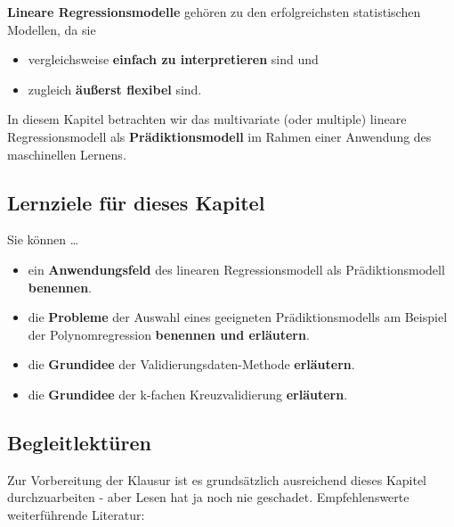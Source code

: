 \documentclass[
  ngerman,
]{book}
\providecommand{\tightlist}{%
  \setlength{\itemsep}{0pt}\setlength{\parskip}{0pt}}
\begin{document}
\textbf{Lineare Regressionsmodelle} gehören zu den erfolgreichsten statistischen Modellen, da sie

\begin{itemize}
\tightlist
\item
  vergleichsweise \textbf{einfach zu interpretieren} sind und
\item
  zugleich \textbf{äußerst flexibel} sind.
\end{itemize}

In diesem Kapitel betrachten wir das multivariate (oder multiple) lineare Regressionsmodell als \textbf{Prädiktionsmodell} im Rahmen einer Anwendung des maschinellen Lernens.

\hypertarget{lernziele-fuxfcr-dieses-kapitel}{%
\subsection*{Lernziele für dieses Kapitel}\label{lernziele-fuxfcr-dieses-kapitel}}

Sie können \ldots{}

\begin{itemize}
\tightlist
\item
  ein \textbf{Anwendungsfeld} des linearen Regressionsmodell als Prädiktionsmodell \textbf{benennen}.
\item
  die \textbf{Probleme} der Auswahl eines geeigneten Prädiktionsmodells am Beispiel der Polynomregression \textbf{benennen und erläutern}.
\item
  die \textbf{Grundidee} der Validierungsdaten-Methode \textbf{erläutern}.
\item
  die \textbf{Grundidee} der k-fachen Kreuzvalidierung \textbf{erläutern}.
\end{itemize}

\hypertarget{begleitlektuxfcren}{%
\subsection*{Begleitlektüren}\label{begleitlektuxfcren}}

Zur Vorbereitung der Klausur ist es grundsätzlich ausreichend dieses Kapitel durchzuarbeiten - aber Lesen hat ja noch nie geschadet. Empfehlenswerte weiterführende Literatur:
\end{document}

